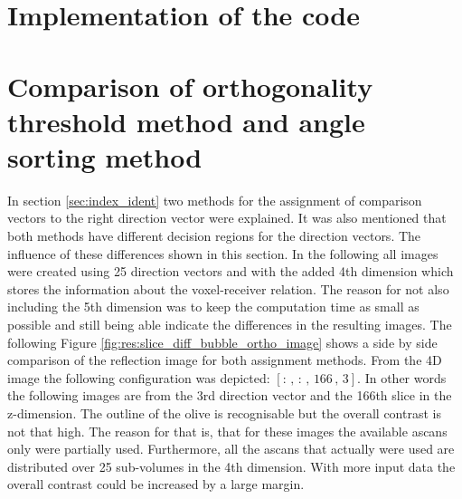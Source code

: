 \section{Implementation of the code}

\section{Comparison of orthogonality threshold method and angle sorting method}

In section \ref{sec:index_ident} two methods for the assignment of comparison vectors to the right direction vector were explained. It was also mentioned that both methods have different decision regions for the direction vectors. The influence of these differences shown in this section. In the following all images were created using 25 direction vectors and with the added 4th dimension which stores the information about the voxel-receiver relation. The reason for not also including the 5th dimension was to keep the computation time as small as possible and still being able indicate the differences in the resulting images. The following Figure \ref{fig:res:slice_diff_bubble_ortho_image} shows a side by side comparison of the reflection image for both assignment methods. From the 4D image the following configuration was depicted: $[:\,,\,:\,,\,166\,,\,3]$. In other words the following images are from the 3rd direction vector and the 166th slice in the z-dimension. The outline of the olive is recognisable but the overall contrast is not that high. The reason for that is, that for these images the available \acp{ascan} only were partially used. Furthermore, all the \acp{ascan} that actually were used are distributed over 25 sub-volumes in the 4th dimension. With more input data the overall contrast could be increased by a large margin.


